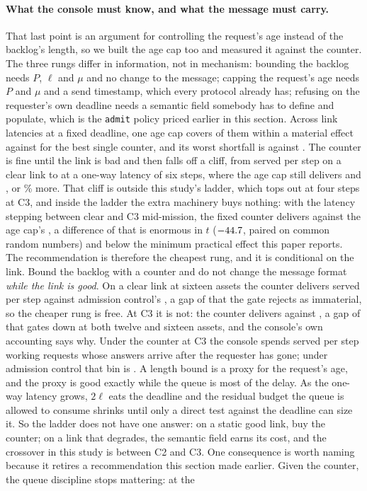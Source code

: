 \documentclass[11pt]{article}
\begin{document}
\paragraph{What the console must know, and what the message must carry.} That last point is an argument for controlling the request's age instead of the backlog's length, so we built the age cap too and measured it against the counter. The three rungs differ in information, not in mechanism: bounding the backlog needs $P$, $\ell$ and $\mu$ and no change to the message; capping the request's age needs $P$ and $\mu$ and a send timestamp, which every protocol already has; refusing on the requester's own deadline needs a semantic field somebody has to define and populate, which is the \texttt{admit} policy priced earlier in this section. Across \QcapLinks{} link latencies at a fixed deadline, one age cap covers \QcapBestAgeCov{} of them within a material effect against \QcapBestCounterCov{} for the best single counter, and its worst shortfall is \QcapBestAgeShort{} against \QcapBestCounterShort{}. The counter is fine until the link is bad and then falls off a cliff, from \QcapCounterClear{} served per step on a clear link to \QcapCounterDeep{} at a one-way latency of six steps, where the age cap still delivers \QcapAgeClear{} and \QcapAgeDeep{}, or \QcapDeepGain\% more. That cliff is outside this study's ladder, which tops out at four steps at C3, and inside the ladder the extra machinery buys nothing: with the latency stepping between clear and C3 mid-mission, the fixed counter delivers \QcapSwitchCounter{} against the age cap's \QcapSwitchAge{}, a difference of \QcapSwitchDiff{} that is enormous in $t$ ($-44.7{}$, paired on common random numbers) and below the minimum practical effect this paper reports. The recommendation is therefore the cheapest rung, and it is conditional on the link. Bound the backlog with a counter and do not change the message format \emph{while the link is good}. On a clear link at sixteen assets the counter delivers \KpClearSrvBound{} served per step against admission control's \KpClearSrvAdmit{}, a gap of \KpClearBoundVsAdmitSixteen{} that the gate rejects as immaterial, so the cheaper rung is free. At C3 it is not: the counter delivers \KpJamSrvBound{} against \KpJamSrvAdmit{}, a gap of \KpJamBoundVsAdmitSixteen{} that gates down at both twelve and sixteen assets, and the console's own accounting says why. Under the counter at C3 the console spends \KpJamLateBound{} served per step working requests whose answers arrive after the requester has gone; under admission control that bin is \KpJamLateAdmit{}. A length bound is a proxy for the request's age, and the proxy is good exactly while the queue is most of the delay. As the one-way latency grows, $2\ell$ eats the deadline and the residual budget the queue is allowed to consume shrinks until only a direct test against the deadline can size it. So the ladder does not have one answer: on a static good link, buy the counter; on a link that degrades, the semantic field earns its cost, and the crossover in this study is between C2 and C3. One consequence is worth naming because it retires a recommendation this section made earlier. Given the counter, the queue discipline stops mattering: at the 
\end{document}
